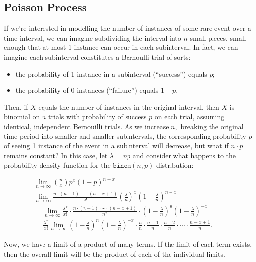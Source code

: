 \documentclass[
]{book}
\providecommand{\tightlist}{%
  \setlength{\itemsep}{0pt}\setlength{\parskip}{0pt}}
\theoremstyle{definition}
\theoremstyle{definition}
\theoremstyle{definition}
\theoremstyle{definition}
\theoremstyle{remark}
\begin{document}
\subsection{Poisson Process}\label{poisson-process}

If we're interested in modelling the number of instances of some rare event over a time interval, we can imagine subdividing the interval into \(n\) small pieces, small enough that at most 1 instance can occur in each subinterval. In fact, we can imagine each subinterval constitutes a Bernoulli trial of sorts:

\begin{itemize}
\tightlist
\item
  the probability of 1 instance in a subinterval (``success'') equals \(p\);
\item
  the probability of 0 instances (``failure'') equals \(1-p\).
\end{itemize}

Then, if \(X\) equals the number of instances in the original interval, then \(X\) is binomial on \(n\) trials with probability of success \(p\) on each trial, assuming identical, independent Bernouilli trials. As we increase \(n,\) breaking the original time period into smaller and smaller subintervals, the corresponding probability \(p\) of seeing 1 instance of the event in a subinterval will decrease, but what if \(n \cdot p\) remains constant? In this case, let \(\lambda = np\) and consider what happens to the probability density function for the \(\texttt{binom}(n,p)\) distribution:

\begin{align*}
\lim_{n \to \infty} \binom{n}{x}p^x(1-p)^{n-x} & = \\
\lim_{n \to \infty} \frac{n\cdot(n-1)\cdot \cdots \cdot (n - x + 1)}{x!} \left(\frac{\lambda}{n}\right)^x\left(1-\frac{\lambda}{n}\right)^{n-x} & \\
=\lim_{n \to \infty} \frac{\lambda^x}{x!}\cdot\frac{n\cdot(n-1)\cdot \cdots \cdot (n - x + 1)}{n^x}\cdot\left(1-\frac{\lambda}{n}\right)^{n}\left(1-\frac{\lambda}{n}\right)^{-x}\\
=\frac{\lambda^x}{x!}\lim_{n \to \infty}\left(1-\frac{\lambda}{n}\right)^{n}\left(1-\frac{\lambda}{n}\right)^{-x} \cdot \frac{n}{n} \cdot \frac{n-1}{n} \cdot \frac{n-2}{n} \cdot \cdots \cdot \frac{n-x+1}{n}.
\end{align*}

Now, we have a limit of a product of many terms. If the limit of each term exists, then the overall limit will be the product of each of the individual limits.
\end{document}
